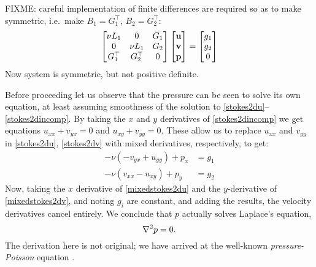 FIXME: careful implementation of finite differences are required so as to make symmetric, i.e.~make $B_1=G_1^\top$, $B_2=G_2^\top$:
    $$\begin{bmatrix}
    \nu L_1 & 0 & G_1 \\
    0 & \nu L_1 & G_2 \\
    G_1^\top & G_2^\top & 0
    \end{bmatrix}
    \begin{bmatrix}
    \mathbf{u} \\ \mathbf{v} \\ \mathbf{p}
    \end{bmatrix}
    =
    \begin{bmatrix}
    g_1 \\ g_2 \\ 0
    \end{bmatrix}$$
Now system is symmetric, but not positive definite.

Before proceeding let us observe that the pressure can be seen to solve its own equation, at least assuming smoothness of the solution to \eqref{stokes2du}--\eqref{stokes2dincomp}.  By taking the $x$ and $y$ derivatives of \eqref{stokes2dincomp} we get equations $u_{xx} + v_{yx} = 0$ and $u_{xy} + v_{yy} = 0$.  These allow us to replace $u_{xx}$ and $v_{yy}$ in \eqref{stokes2du}, \eqref{stokes2dv} with mixed derivatives, respectively, to get:
\begin{align}
-\nu \left(-v_{yx} + u_{yy}\right) + p_x &= g_1 \label{mixedstokes2du} \\
-\nu \left(v_{xx} - u_{xy}\right) + p_y &= g_2 \label{mixedstokes2dv}
\end{align}
Now, taking the $x$ derivative of \eqref{mixedstokes2du} and the $y$-derivative of \eqref{mixedstokes2dv}, and noting $g_i$ are constant, and adding the results, the velocity derivatives cancel entirely.  We conclude that $p$ actually solves Laplace's equation,
\begin{equation}
\nabla^2 p = 0. \label{pressurepoisson}
\end{equation}
The derivation here is not original; we have arrived at the well-known \emph{pressure-Poisson} equation \citep[FIXME: check]{Ockendonetal2003}.

